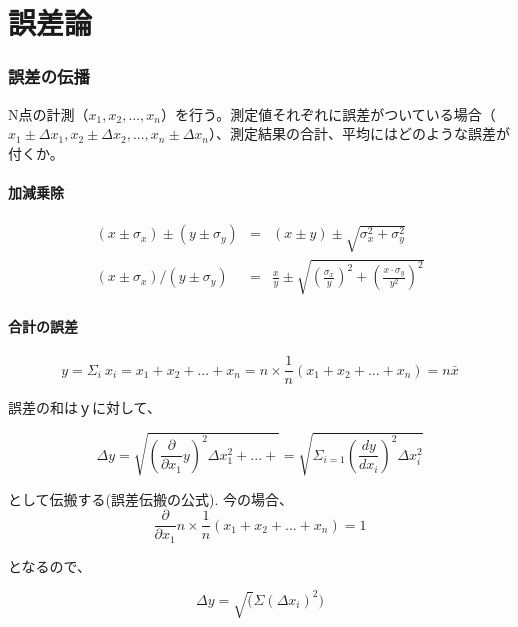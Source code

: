 \chapter{誤差論}
\subsection{誤差の伝播}
N点の計測（$x_1, x_2, ..., x_n$）を行う。測定値それぞれに誤差がついている場合（$x_1\pm\Delta x_1, x_2\pm\Delta x_2, ..., x_n\pm\Delta x_n$）、測定結果の合計、平均にはどのような誤差が付くか。


\subsubsection{加減乗除}

\begin{eqnarray}
  (x\pm \sigma_x) \pm ( y \pm \sigma_y) &=& (x\pm y) \pm \sqrt{ \sigma_x^2 + \sigma_y^2} \\
  (x\pm \sigma_x) / ( y \pm \sigma_y)   &=& \frac{x}{y} \pm \sqrt{ \left( \frac{\sigma_x}{y} \right)^2 + \left( \frac{x \cdot \sigma_y}{ y^2} \right)^2}
\end{eqnarray}



\subsubsection{合計の誤差}

\begin{equation}
  y=\Sigma_i~x_i=x_1+x_2+...+x_n=n\times\frac{1}{n}(x_1+x_2+...+x_n)=n\bar{x}
\end{equation}

誤差の和はｙに対して、

\begin{equation}
  \Delta y = \sqrt{\left(\frac{\partial}{\partial x_1}y \right)^2 \Delta x_1^2 + ... + } = \sqrt{\Sigma_{i=1}\left(\frac{dy}{dx_i}\right)^2\Delta x_i^2}
\end{equation}

として伝搬する(誤差伝搬の公式).
今の場合、
\begin{equation}
  \frac{\partial}{\partial x_1}n\times \frac{1}{n}(x_1+x_2+...+x_n)=1
\end{equation}

となるので、

\begin{equation}
  \Delta y=\sqrt(\Sigma(\Delta x_i)^2)
\end{equation}

